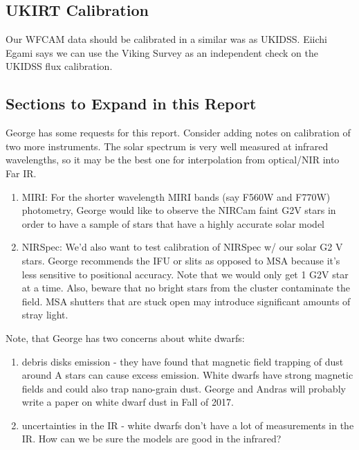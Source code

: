 \documentclass{aastex6}
\begin{document}
\subsection{UKIRT Calibration}

Our WFCAM data should be calibrated in a similar was as UKIDSS.
Eiichi Egami says we can use the Viking Survey as an independent check on the UKIDSS flux calibration.

\subsection{Sections to Expand in this Report}

George has some requests for this report.
Consider adding notes on calibration of two more instruments.
The solar spectrum is very well measured at infrared wavelengths, so it may be the best one for interpolation from optical/NIR into Far IR.
\begin{enumerate}
	\item MIRI: For the shorter wavelength MIRI bands (say F560W and F770W) photometry, George would like to observe the NIRCam faint G2V stars in order to have a sample of stars that have a highly accurate solar model
	\item NIRSpec: We'd also want to test calibration of NIRSpec w/ our solar G2 V stars.
George recommends the IFU or slits as opposed to MSA because it's less sensitive to positional accuracy.
Note that we would only get 1 G2V star at a time.
Also, beware that no bright stars from the cluster contaminate the field. MSA shutters that are stuck open may introduce significant amounts of stray light.
\end{enumerate}
Note, that George has two concerns about white dwarfs:
\begin{enumerate}
	\item debris disks emission - they have found that magnetic field trapping of dust around A stars can cause excess emission.
White dwarfs have strong magnetic fields and could also trap nano-grain dust.
George and Andras will probably write a paper on white dwarf dust in Fall of 2017.
	\item uncertainties in the IR - white dwarfs don't have a lot of measurements in the IR.
How can we be sure the models are good in the infrared?
\end{enumerate}
\end{document}
